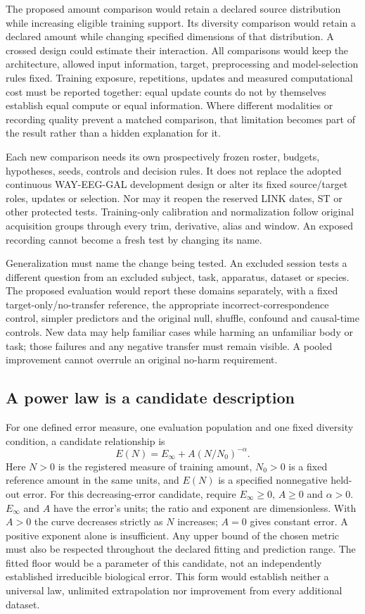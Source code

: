 The proposed amount comparison would retain a declared source distribution while increasing eligible training support. Its diversity comparison would retain a declared amount while changing specified dimensions of that distribution. A crossed design could estimate their interaction. All comparisons would keep the architecture, allowed input information, target, preprocessing and model-selection rules fixed. Training exposure, repetitions, updates and measured computational cost must be reported together: equal update counts do not by themselves establish equal compute or equal information. Where different modalities or recording quality prevent a matched comparison, that limitation becomes part of the result rather than a hidden explanation for it.

Each new comparison needs its own prospectively frozen roster, budgets, hypotheses, seeds, controls and decision rules. It does not replace the adopted continuous WAY-EEG-GAL development design or alter its fixed source/target roles, updates or selection. Nor may it reopen the reserved LINK dates, ST or other protected tests. Training-only calibration and normalization follow original acquisition groups through every trim, derivative, alias and window. An exposed recording cannot become a fresh test by changing its name.

Generalization must name the change being tested. An excluded session tests a different question from an excluded subject, task, apparatus, dataset or species. The proposed evaluation would report these domains separately, with a fixed target-only/no-transfer reference, the appropriate incorrect-correspondence control, simpler predictors and the original null, shuffle, confound and causal-time controls. New data may help familiar cases while harming an unfamiliar body or task; those failures and any negative transfer must remain visible. A pooled improvement cannot overrule an original no-harm requirement.

\subsection{A power law is a candidate description}

For one defined error measure, one evaluation population and one fixed diversity condition, a candidate relationship is
\[
E(N)=E_{\infty}+A\left(N/N_0\right)^{-\alpha}.
\]
Here $N>0$ is the registered measure of training amount, $N_0>0$ is a fixed reference amount in the same units, and $E(N)$ is a specified nonnegative held-out error. For this decreasing-error candidate, require $E_{\infty}\geq0$, $A\geq0$ and $\alpha>0$. $E_{\infty}$ and $A$ have the error's units; the ratio and exponent are dimensionless. With $A>0$ the curve decreases strictly as $N$ increases; $A=0$ gives constant error. A positive exponent alone is insufficient. Any upper bound of the chosen metric must also be respected throughout the declared fitting and prediction range. The fitted floor would be a parameter of this candidate, not an independently established irreducible biological error. This form would establish neither a universal law, unlimited extrapolation nor improvement from every additional dataset.

